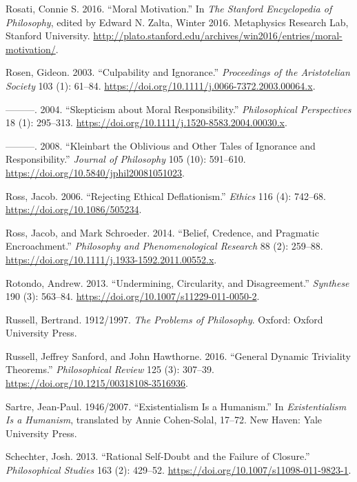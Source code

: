 \documentclass[
  10pt,
  letterpaper,
  twoside]{scrbook}
\newlength{\cslhangindent}
\newenvironment{CSLReferences}[2] %
 {\begin{list}{}{%
  \setlength{\itemindent}{0pt}
  \setlength{\leftmargin}{0pt}
  \setlength{\parsep}{0pt}
  \ifodd #1
   \setlength{\leftmargin}{\cslhangindent}
   \setlength{\itemindent}{-1\cslhangindent}
  \fi
  \setlength{\itemsep}{#2\baselineskip}}}
 {\end{list}}
\begin{document}
\begin{CSLReferences}{1}{0}
Rosati, Connie S. 2016. {``Moral Motivation.''} In \emph{The Stanford
Encyclopedia of Philosophy}, edited by Edward N. Zalta, Winter 2016.
Metaphysics Research Lab, Stanford University.
\url{http://plato.stanford.edu/archives/win2016/entries/moral-motivation/}.

Rosen, Gideon. 2003. {``Culpability and Ignorance.''} \emph{Proceedings
of the Aristotelian Society} 103 (1): 61--84.
\url{https://doi.org/10.1111/j.0066-7372.2003.00064.x}.

---------. 2004. {``Skepticism about Moral Responsibility.''}
\emph{Philosophical Perspectives} 18 (1): 295--313.
\url{https://doi.org/10.1111/j.1520-8583.2004.00030.x}.

---------. 2008. {``Kleinbart the Oblivious and Other Tales of Ignorance
and Responsibility.''} \emph{Journal of Philosophy} 105 (10): 591--610.
\url{https://doi.org/10.5840/jphil20081051023}.

Ross, Jacob. 2006. {``Rejecting Ethical Deflationism.''} \emph{Ethics}
116 (4): 742--68. \url{https://doi.org/10.1086/505234}.

Ross, Jacob, and Mark Schroeder. 2014. {``Belief, Credence, and
Pragmatic Encroachment.''} \emph{Philosophy and Phenomenological
Research} 88 (2): 259--88.
\url{https://doi.org/10.1111/j.1933-1592.2011.00552.x}.

Rotondo, Andrew. 2013. {``Undermining, Circularity, and Disagreement.''}
\emph{Synthese} 190 (3): 563--84.
\url{https://doi.org/10.1007/s11229-011-0050-2}.

Russell, Bertrand. 1912/1997. \emph{The Problems of Philosophy}. Oxford:
Oxford University Press.

Russell, Jeffrey Sanford, and John Hawthorne. 2016. {``General Dynamic
Triviality Theorems.''} \emph{Philosophical Review} 125 (3): 307--39.
\url{https://doi.org/10.1215/00318108-3516936}.

Sartre, Jean-Paul. 1946/2007. {``Existentialism Is a Humanism.''} In
\emph{Existentialism Is a Humanism}, translated by Annie Cohen-Solal,
17--72. New Haven: Yale University Press.

Schechter, Josh. 2013. {``Rational Self-Doubt and the Failure of
Closure.''} \emph{Philosophical Studies} 163 (2): 429--52.
\url{https://doi.org/10.1007/s11098-011-9823-1}.


\end{CSLReferences}
\end{document}
